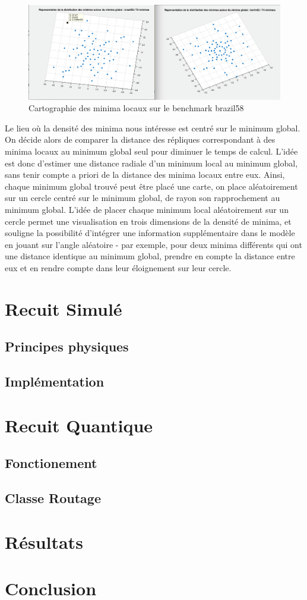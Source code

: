 \documentclass{article}%
\begin{document}
\begin{figure}[h]
\begin{center}
\includegraphics[scale=0.3]{cartes.png} 
\caption{Cartographie des minima locaux sur le benchmark brazil58}
\end{center}
\end{figure}


      Le lieu où la densité des minima nous intéresse est centré sur le minimum global.  On décide alors de comparer la distance des répliques correspondant à des minima locaux au minimum global seul pour diminuer le temps de calcul.
      L’idée est donc d’estimer une distance radiale d’un minimum local au minimum global, sans tenir compte a priori de la distance des minima locaux entre eux. Ainsi, chaque minimum global trouvé peut être placé une carte, on place aléatoirement sur un cercle centré sur le minimum global, de rayon son rapprochement au minimum global.
      L’idée de placer chaque minimum local aléatoirement sur un cercle permet une visualisation en trois dimensions de la densité de minima, et souligne la possibilité d’intégrer une information supplémentaire dans le modèle en jouant sur l’angle aléatoire - par exemple, pour deux minima différents qui ont une distance identique au minimum global, prendre en compte la distance entre eux et en rendre compte dans leur éloignement sur leur cercle.

\section{Recuit Simulé}
\subsection{Principes physiques}
\subsection{Implémentation}

\section{Recuit Quantique}
\subsection{Fonctionement}
\subsection{Classe Routage}

\section{Résultats}


\section*{Conclusion}

\listoffigures

\end{document}
